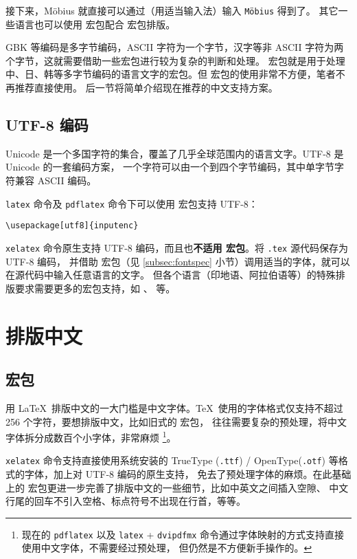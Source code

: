 接下来，M\"obius 就直接可以通过（用适当输入法）输入 \texttt{M\"obius} 得到了。
其它一些语言也可以使用  宏包配合  宏包排版。

GBK 等编码是多字节编码，ASCII 字符为一个字节，汉字等非 ASCII 字符为两个字节，这就需要借助一些宏包进行较为复杂的判断和处理。
 宏包就是用于处理中、日、韩等多字节编码的语言文字的宏包。但  宏包的使用非常不方便，笔者不再推荐直接使用。
后一节将简单介绍现在推荐的中文支持方案。

\subsection{UTF-8 编码}\label{subsec:utf8}

Unicode 是一个多国字符的集合，覆盖了几乎全球范围内的语言文字。UTF-8 是 Unicode 的一套编码方案，
一个字符可以由一个到四个字节编码，其中单字节字符兼容 ASCII 编码。

\texttt{latex} 命令及 \texttt{pdflatex} 命令下可以使用  宏包支持 UTF-8：
\begin{verbatim}
\usepackage[utf8]{inputenc}
\end{verbatim}

\texttt{xelatex} 命令原生支持 UTF-8 编码，而且也\textbf{不适用  宏包}。将 \texttt{.tex} 源代码保存为 UTF-8 编码，
并借助  宏包（见 \ref{subsec:fontspec} 小节）调用适当的字体，就可以在源代码中输入任意语言的文字。
但各个语言（印地语、阿拉伯语等）的特殊排版要求需要更多的宏包支持，如 、  等。

\section{排版中文}\label{sec:chinese}

\subsection{ 宏包}\label{subsec:xeCJK}

用 \LaTeX\ 排版中文的一大门槛是中文字体。\TeX\ 使用的字体格式仅支持不超过 256 个字符，要想排版中文，比如旧式的  宏包，
往往需要复杂的预处理，将中文字体拆分成数百个小字体，非常麻烦%
\footnote{现在的 \texttt{pdflatex} 以及 \texttt{latex} + \texttt{dvipdfmx} 命令通过字体映射的方式支持直接使用中文字体，不需要经过预处理，
但仍然是不方便新手操作的。}。

\texttt{xelatex} 命令支持直接使用系统安装的 TrueType (\texttt{.ttf}) / OpenType(\texttt{.otf}) 等格式的字体，加上对 UTF-8 编码的原生支持，
免去了预处理字体的麻烦。在此基础上的  宏包更进一步完善了排版中文的一些细节，比如中英文之间插入空隙、
中文行尾的回车不引入空格、标点符号不出现在行首，等等。


